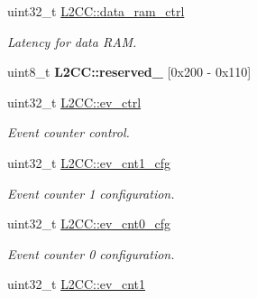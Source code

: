 \begin{DoxyCompactItemize}
\mbox{\label{group__L2C-310__cache_gacc2ea3f16556bba6560d489614f628bd}} 
uint32\+\_\+t \mbox{\hyperlink{group__L2C-310__cache_gacc2ea3f16556bba6560d489614f628bd}{L2\+C\+C\+::data\+\_\+ram\+\_\+ctrl}}
\begin{DoxyCompactList}\small\item\em Latency for data R\+AM. \end{DoxyCompactList}\item 
\mbox{\label{group__L2C-310__cache_ga8fa0876dacb9ca245262523818c6eef0}} 
uint8\+\_\+t {\bfseries L2\+C\+C\+::reserved\+\_} \mbox{[}0x200 -\/ 0x110\mbox{]}
\item 
\mbox{\label{group__L2C-310__cache_gad6a808e6a103d85e6c0318a25774b506}} 
uint32\+\_\+t \mbox{\hyperlink{group__L2C-310__cache_gad6a808e6a103d85e6c0318a25774b506}{L2\+C\+C\+::ev\+\_\+ctrl}}
\begin{DoxyCompactList}\small\item\em Event counter control. \end{DoxyCompactList}\item 
\mbox{\label{group__L2C-310__cache_gae073cc44f67c7934f242eb46f12dfaae}} 
uint32\+\_\+t \mbox{\hyperlink{group__L2C-310__cache_gae073cc44f67c7934f242eb46f12dfaae}{L2\+C\+C\+::ev\+\_\+cnt1\+\_\+cfg}}
\begin{DoxyCompactList}\small\item\em Event counter 1 configuration. \end{DoxyCompactList}\item 
\mbox{\label{group__L2C-310__cache_ga6c46eba15d5dfd57721d4f1f61011c21}} 
uint32\+\_\+t \mbox{\hyperlink{group__L2C-310__cache_ga6c46eba15d5dfd57721d4f1f61011c21}{L2\+C\+C\+::ev\+\_\+cnt0\+\_\+cfg}}
\begin{DoxyCompactList}\small\item\em Event counter 0 configuration. \end{DoxyCompactList}\item 
\mbox{\label{group__L2C-310__cache_ga0a61743f05c11c6e07fd4ef94c141b35}} 
uint32\+\_\+t \mbox{\hyperlink{group__L2C-310__cache_ga0a61743f05c11c6e07fd4ef94c141b35}{L2\+C\+C\+::ev\+\_\+cnt1}}

\end{DoxyCompactItemize}
